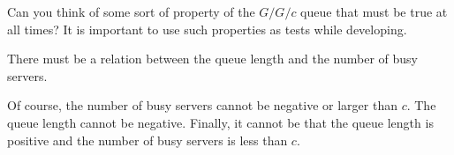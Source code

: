 \documentclass{scrartcl}
\begin{document}
\begin{exercise}
  Can you think of some sort of property of the $G/G/c$ queue that must be true at all times? It is important to use such properties  as tests while developing.
  \hintsymbol\begin{hint}
    There must be a relation between the queue length and the number of busy servers.
  \end{hint}
  \begin{solution}
    Of course, the number of busy servers cannot be negative or larger than $c$. The queue length cannot be negative. Finally, it cannot be that  the queue length is positive and the number of busy servers is less than $c$. 
  \end{solution}
\end{exercise}
\end{document}
